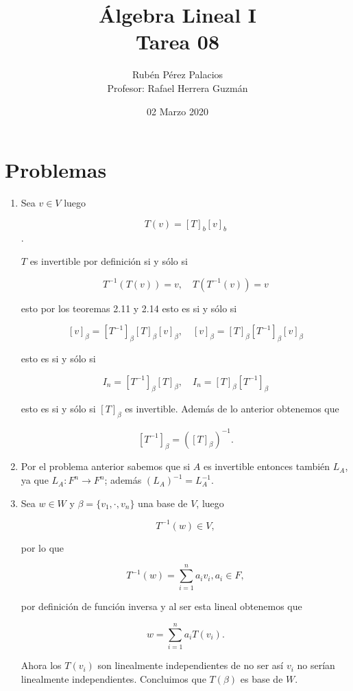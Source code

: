 \documentclass[letterpaper]{article}
\title{Álgebra Lineal I\\Tarea 08}
\author{Rubén Pérez Palacios\\Profesor: Rafael Herrera Guzmán}
\date{02 Marzo 2020}
\theoremstyle{definition}
\theoremstyle{lemathm}
\theoremstyle{lemademthm}
\begin{document}
	\maketitle
    
    \section*{Problemas}

    \begin{enumerate}
        
        \item Sea $v \in V$ luego
        
        \[T(v) = [T]_b [v]_b\].

        $T$ es invertible por definición si y sólo si

        \[T^{-1}(T(v)) = v, \quad T(T^{-1}(v)) = v\]

        esto por los teoremas 2.11 y 2.14 esto es si y sólo si

        \[[v]_\beta = [T^{-1}]_\beta[T]_\beta[v]_\beta, \quad [v]_\beta = [T]_\beta[T^{-1}]_\beta[v]_\beta\]

        esto es si y sólo si

        \[I_n = [T^{-1}]_\beta[T]_\beta, \quad I_n = [T]_\beta[T^{-1}]_\beta\]

        esto es si y sólo si $[T]_\beta$ es invertible. Además de lo anterior obtenemos que

        \[[T^{-1}]_\beta = ([T]_\beta)^{-1}.\]

        \item Por el problema anterior sabemos que si $A$ es invertible entonces también $L_A$, ya que $L_A : F^n \rightarrow F^n$; además $(L_A)^{-1} = L^{-1}_A$.
		
		\newpage

		\item Sea $w \in W$ y $\beta = \{v_1,\cdot,v_n\}$ una base de $V$, luego
		
		\[T^{-1}(w) \in V,\]

		por lo que

		\[T^{-1}(w) = \sum_{i=1}^n a_iv_i, a_i \in F,\]

		por definición de función inversa y al ser esta lineal obtenemos que

		\[w = \sum_{i=1}^na_iT(v_i).\]

		Ahora los $T(v_i)$ son linealmente independientes de no ser así $v_i$ no serían linealmente independientes. Concluimos que $T(\beta)$ es base de $W$.


\end{enumerate}
\end{document}

